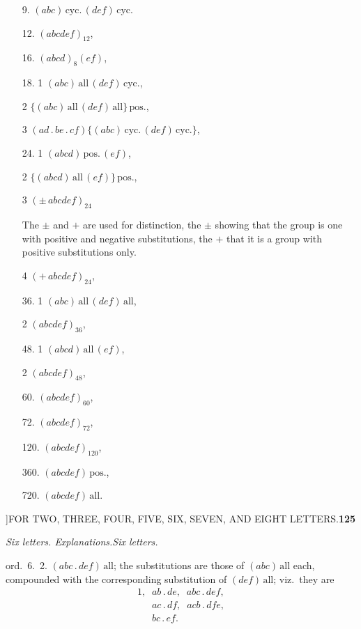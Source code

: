 \documentclass[11pt]{article}
\begin{document}
\begin{itemize}
\item[9.] $(abc)\,\text{cyc.}\,(def)\,\text{cyc.}$
\item[12.] $(abcdef)_{12}$,
\item[16.] $(abcd)_{8}(ef)$,
\item[18.] 1\;\; $(abc)\,\text{all}\,(def)\,\text{cyc.}$,
\item[] \hspace{1.5em}2\;\; $\{(abc)\,\text{all}\,(def)\,\text{all}\}\,\text{pos.}$,
\item[] \hspace{1.5em}3\;\; $(ad\,.\,be\,.\,cf)\{(abc)\,\text{cyc.}\,(def)\,\text{cyc.}\}$,
\item[24.] 1\;\; $(abcd)\,\text{pos.}\,(ef)$,
\item[] \hspace{1.5em}2\;\; $\{(abcd)\,\text{all}\,(ef)\}\,\text{pos.}$,
\item[] \hspace{1.5em}3\;\; $(\pm\,abcdef)_{24}$\quad\parbox{6cm}{\small The $\pm$ and $+$ are used for distinction, the $\pm$ showing that the group is one with positive and negative substitutions, the $+$ that it is a group with positive substitutions only.}
\item[] \hspace{1.5em}4\;\; $(+\,abcdef)_{24}$,
\item[36.] 1\;\; $(abc)\,\text{all}\,(def)\,\text{all}$,
\item[] \hspace{1.5em}2\;\; $(abcdef)_{36}$,
\item[48.] 1\;\; $(abcd)\,\text{all}\,(ef)$,
\item[] \hspace{1.5em}2\;\; $(abcdef)_{48}$,
\item[60.] $(abcdef)_{60}$,
\item[72.] $(abcdef)_{72}$,
\item[120.] $(abcdef)_{120}$,
\item[360.] $(abcdef)\,\text{pos.}$,
\item[720.] $(abcdef)\,\text{all.}$
\end{itemize}

\newpage
{}]\hfill FOR TWO, THREE, FOUR, FIVE, SIX, SEVEN, AND EIGHT LETTERS.\hfill\textbf{125}

\smallskip
\noindent\textit{Six letters. Explanations.}\hfill\textit{Six letters.}

\smallskip
\hspace{1em} ord.\ 6.~2. $(abc\,.\,def)\,\text{all}$; the substitutions are
those of $(abc)\,\text{all}$ each, compounded with the corresponding
substitution of $(def)\,\text{all}$; viz.\ they are
\[
\begin{array}{l}
1,\;\; ab\,.\,de,\;\; abc\,.\,def,\\
\phantom{1,\;\;}ac\,.\,df,\;\; acb\,.\,dfe,\\
\phantom{1,\;\;}bc\,.\,ef.
\end{array}
\]
\end{document}

